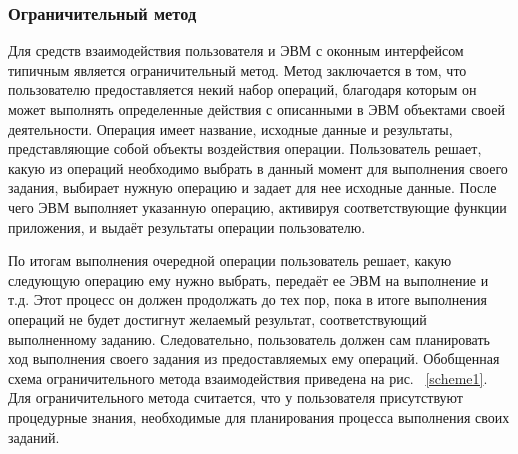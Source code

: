 \def\notedate{2022.10.10}
\def\currentauthor{Василян А.Р. (РК6-73Б)}

\subsubsection{Ограничительный метод}
	Для средств взаимодействия пользователя и ЭВМ с оконным интерфейсом типичным является ограничительный метод. Метод заключается в том, что пользователю предоставляется некий набор операций, благодаря которым он может выполнять определенные действия с описанными в ЭВМ объектами своей деятельности. Операция имеет название, исходные данные и результаты, представляющие собой объекты воздействия операции. Пользователь решает, какую из операций необходимо выбрать в данный момент для выполнения своего задания, выбирает нужную операцию и задает для нее исходные данные. После чего ЭВМ выполняет указанную операцию, активируя соответствующие функции приложения, и выдаёт результаты операции пользователю. 
	
	По итогам выполнения очередной операции пользователь решает, какую следующую операцию ему нужно выбрать, передаёт ее ЭВМ на выполнение и т.д. Этот процесс он должен продолжать до тех пор, пока в итоге выполнения операций не будет достигнут желаемый результат, соответствующий выполненному заданию. Следовательно, пользователь должен сам планировать ход выполнения своего задания из предоставляемых ему операций. Обобщенная схема ограничительного метода взаимодействия приведена на рис. ~\ref{scheme1}. Для ограничительного метода считается, что у пользователя присутствуют процедурные знания, необходимые для планирования процесса выполнения своих заданий.

